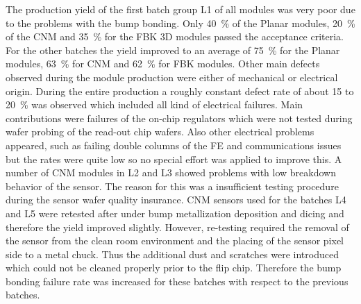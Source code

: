 The production yield of the first batch group L1 of all modules was very poor due to the problems with the bump bonding.\cite{IZM_bonding} Only 40~\% of the Planar  modules, \SI{20}{\percent} of the CNM and \SI{35}{\percent} for the FBK 3D modules passed the acceptance criteria. For the other batches the yield improved to an average of \SI{75}{\percent} for the Planar  modules, \SI{63}{\percent} for CNM and \SI{62}{\percent} for FBK modules. %
Other main defects observed during the module production were either of mechanical or electrical origin. During the entire production a roughly constant defect rate of about 15 to \SI{20}{\percent} was observed which included all kind of electrical failures. Main contributions were failures of the on-chip regulators which were not tested during wafer probing of the read-out chip wafers. Also other electrical problems appeared, such as failing double columns of the FE and communications issues but the rates were quite low so no special effort was applied to improve this. A number of CNM modules in L2 and L3 showed problems with low breakdown behavior of the sensor. The reason for this was a insufficient testing procedure during the sensor wafer quality insurance. CNM sensors used for the batches L4 and L5 were retested after under bump metallization deposition and dicing and therefore the yield improved slightly. However, re-testing required the removal of the sensor from the clean room environment and the placing of the sensor pixel side to a metal chuck. Thus the additional dust and scratches were introduced which could not be cleaned properly prior to the flip chip. Therefore the bump bonding failure rate was increased for these batches with respect to the previous batches.\\



